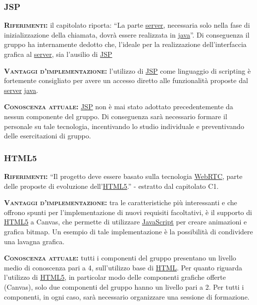 \subsubsection{JSP}
\begin{description}
	\item{\scshape\bfseries Riferimenti:} il capitolato riporta: ``La parte \underline{server}, necessaria solo nella fase di inizializzazione della chiamata, dovrà essere realizzata in \underline{java}''. Di conseguenza il gruppo ha internamente dedotto che, l'ideale per la realizzazione dell'interfaccia grafica al \underline{server}, sia l'ausilio di \underline{JSP}
	
	\item{\scshape\bfseries Vantaggi d'implementazione:} l'utilizzo di \underline{JSP} come linguaggio di scripting è fortemente consigliato per avere un accesso diretto alle funzionalità proposte dal \underline{server} \underline{java}.

	\item{\scshape\bfseries Conoscenza attuale:} \underline{JSP} non è mai stato adottato precedentemente da nessun componente del gruppo. Di conseguenza sarà necessario formare il personale su tale tecnologia, incentivando lo studio individuale e preventivando delle esercitazioni di gruppo.
\end{description}

\subsubsection{HTML5}
\begin{description}
	\item{\scshape\bfseries Riferimenti:} ``Il progetto deve essere basato sulla tecnologia \underline{WebRTC}, parte delle proposte di evoluzione dell'\underline{HTML5}.'' - estratto dal capitolato C1.
	
	\item{\scshape\bfseries Vantaggi d'implementazione:} tra le caratteristiche più interessanti e che offrono spunti per l'implementazione di nuovi requisiti facoltativi, è il supporto di \underline{HTML5} a Canvas, che permette di utilizzare \underline{JavaScript} per creare animazioni e grafica bitmap. Un esempio di tale implementazione è la possibilità di condividere una lavagna grafica.
	
	\item{\scshape\bfseries Conoscenza attuale:} tutti i componenti del gruppo presentano un livello medio di conoscenza pari a 4, sull'utilizzo base di \underline{HTML}. Per quanto riguarda l'utilizzo di \underline{HTML5}, in particolar modo delle componenti grafiche offerte (Canvas), solo due componenti del gruppo hanno un livello pari a 2. Per tutti i componenti, in ogni caso, sarà necessario organizzare una sessione di formazione.
\end{description}

